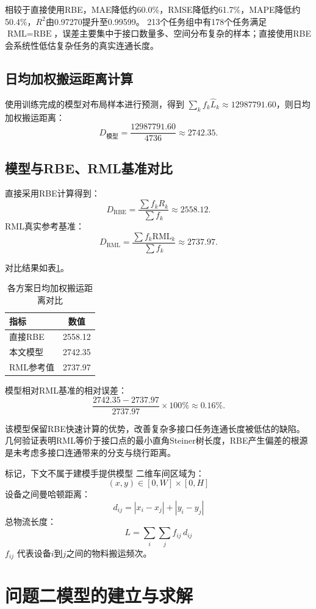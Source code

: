 \documentclass[12pt,a4paper]{article}
\begin{document}
	相较于直接使用RBE，MAE降低约60.0\%，RMSE降低约61.7\%，MAPE降低约50.4\%，$R^2$由0.97270提升至0.99599。
	213个任务组中有178个任务满足 $\text{RML}=\text{RBE}$，误差主要集中于接口数量多、空间分布复杂的样本；直接使用RBE会系统性低估复杂任务的真实连通长度。
	
	\subsection{日均加权搬运距离计算}
	使用训练完成的模型对布局样本进行预测，得到 $\sum_{k} f_{k} \hat{L}_{k} \approx 12987791.60$，则日均加权搬运距离：
	\[
	D_{\text{模型}}=\frac{12987791.60}{4736} \approx 2742.35.
	\]
	
	\subsection{模型与RBE、RML基准对比}
	直接采用RBE计算得到：
	\[
	D_{\text{RBE}}=\frac{\sum f_{k} R_{k}}{\sum f_{k}} \approx 2558.12.
	\]
	RML真实参考基准：
	\[
	D_{\text{RML}}=\frac{\sum f_{k} \text{RML}_{k}}{\sum f_{k}} \approx 2737.97.
	\]
	
	对比结果如表\ref{tab:compare_indicator}。
	\begin{table}[htbp]
		\centering
		\caption{各方案日均加权搬运距离对比}
		\label{tab:compare_indicator}
		\begin{tabular}{lc}
			\toprule
			指标 & 数值 \\
			\midrule
			直接RBE & 2558.12 \\
			本文模型 & 2742.35 \\
			RML参考值 & 2737.97 \\
			\bottomrule
		\end{tabular}
	\end{table}
	
	模型相对RML基准的相对误差：
	\[
	\frac{2742.35-2737.97}{2737.97} \times 100 \% \approx 0.16 \%.
	\]
	
	该模型保留RBE快速计算的优势，改善复杂多接口任务连通长度被低估的缺陷。几何验证表明RML等价于接口点的最小直角Steiner树长度，RBE产生偏差的根源是未考虑多接口连通带来的分支与绕行距离。
	
	标记，下文不属于建模手提供模型
	二维车间区域为：
	\[
	(x,y)\in [0,W] \times [0,H]
	\]
	设备之间曼哈顿距离：
	\[
	d_{ij} = |x_i - x_j| + |y_i - y_j|
	\]
	总物流长度：
	\[
	L = \sum_{i}\sum_{j} f_{ij} \, d_{ij}
	\]
	$f_{ij}$ 代表设备$i$到$j$之间的物料搬运频次。
	
	\section{问题二模型的建立与求解}
\end{document}
